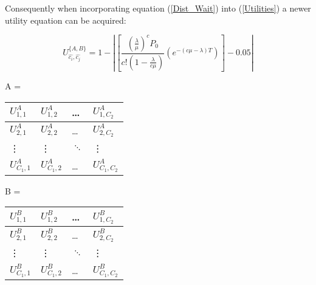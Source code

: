Consequently when incorporating equation (\ref{Dist_Wait}) into (\ref{Utilities}) 
a newer utility equation can be acquired:
 
\begin{equation}\label{Utilities2}
    U_{\hat{c_i}, \hat{c_j}} ^ {\{A, B\}} = 1 - \left| \left[ 
        \frac{(\frac{\lambda}{\mu})^c P_0}{c!(1-\frac{\lambda}{c \mu})} 
        \left( e^{-(c \mu - \lambda)T} \right) \right] - 0.05 \right|
\end{equation}

\begin{table}[h]
    \centering
    \begin{minipage}{.5\linewidth}
        A = 
        \begin{tabular}{|l|l|l|l|}
            \hline
            \( U_{1,1}^A \) & \( U_{1,2}^A \) & \dots & \( U_{1,C_2}^A \) \\ \hline
            \( U_{2,1}^A \) & \( U_{2,2}^A \) & \dots & \( U_{2,C_2}^A \) \\ \hline
            \vdots & \vdots & \( \ddots \) & \vdots \\ \hline
            \( U_{C_1,1}^A \) & \( U_{C_1,2}^A \) & \dots & \( U_{C_1,C_2}^A \) \\ \hline
        \end{tabular}
    \end{minipage}%
    \begin{minipage}{.5\linewidth}
        B = 
        \begin{tabular}{|l|l|l|l|}
            \hline
            \( U_{1,1}^B \) & \( U_{1,2}^B \) & \dots & \( U_{1,C_2}^B \) \\ \hline
            \( U_{2,1}^B \) & \( U_{2,2}^B \) & \dots & \( U_{2,C_2}^B \) \\ \hline
            \vdots & \vdots & \( \ddots \) & \vdots \\ \hline
            \( U_{C_1,1}^B \) & \( U_{C_1,2}^B \) & \dots & \( U_{C_1,C_2}^B \) \\ \hline
        \end{tabular}
    \end{minipage}
\end{table}  
